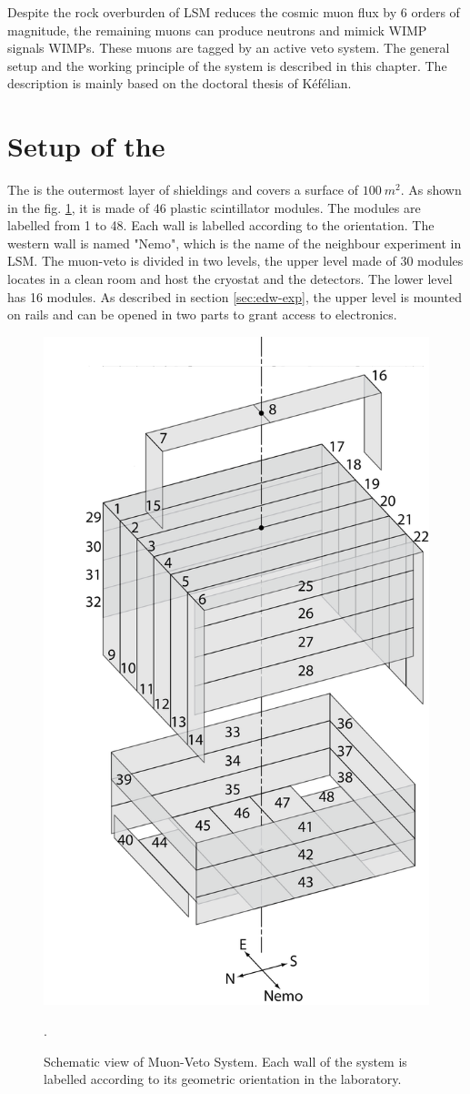 Despite the rock overburden of LSM reduces the cosmic muon flux by 6 orders of magnitude, the remaining muons can produce neutrons and mimick WIMP signals WIMPs. These muons are tagged by an active veto system. The general setup and the working principle of the system is described in this chapter. The description is mainly based on the doctoral thesis of K{\'{e}}f{\'{e}}lian. \cite{Kef16}



\section{Setup of the \mvs}
\label{sec:muon-setup}

The \mvs is the outermost layer of shieldings and covers a surface of $\SI{100}{m^{2}}$. As shown in the fig. \ref{fig:muon-setup}, it is made of 46 plastic scintillator modules. The modules are labelled from 1 to 48. Each wall is labelled according to the orientation. The western wall is named "Nemo", which is the name of the neighbour experiment in LSM.
The muon-veto is divided in two levels, the upper level made of 30 modules locates in a clean room and host the cryostat and the detectors. The lower level has 16 modules. As described in section \ref{sec:edw-exp}, the upper level is mounted on rails and can be opened in two parts to grant access to electronics.

\begin{figure}[ht!]
  \centering
  \includegraphics[width=0.5\textwidth{}]{./fig/Veto.png}
  \caption{Schematic view of Muon-Veto System. Each wall of the system is labelled according to its geometric orientation in the laboratory. }.
  \label{fig:muon-setup}
\end{figure}

